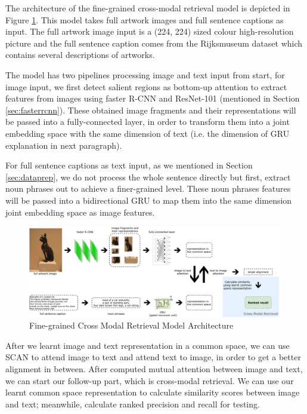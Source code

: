 The architecture of the fine-grained cross-modal retrieval model is depicted in Figure \ref{fig:mainarch}. This model takes full artwork images and full sentence captions as input. The full artwork image input is a (224, 224) sized colour high-resolution picture and the full sentence caption comes from the Rijksmuseum dataset \cite{MensinkICMIR2014} which contains several descriptions of artworks.

The model has two pipelines processing image and text input from start, for image input, we first detect salient regions as bottom-up attention \cite{bottomup} to extract features from images using faster R-CNN \cite{fasterrcnn} and ResNet-101 \cite{resnet} (mentioned in Section \ref{sec:fasterrcnn}). These obtained image fragments and their representations will be passed into a fully-connected layer, in order to transform them into a joint embedding space with the same dimension of text (i.e. the dimension of GRU explanation in next paragraph).

For full sentence captions as text input, as we mentioned in Section \ref{sec:dataprep}, we do not process the whole sentence directly but first, extract noun phrases out to achieve a finer-grained level. These noun phrases features will be passed into a bidirectional GRU to map them into the same dimension joint embedding space as image features. 

\begin{figure}[h!]
\centering
\includegraphics[width=1.0\textwidth]{archi.pdf}
\caption{Fine-grained Cross Modal Retrieval Model Architecture}
\label{fig:mainarch}
\end{figure}

After we learnt image and text representation in a common space, we can use SCAN to attend image to text and attend text to image, in order to get a better alignment in between. After computed mutual attention between image and text, we can start our follow-up part, which is cross-modal retrieval. We can use our learnt common space representation to calculate similarity scores between image and text; meanwhile, calculate ranked precision and recall for testing.


